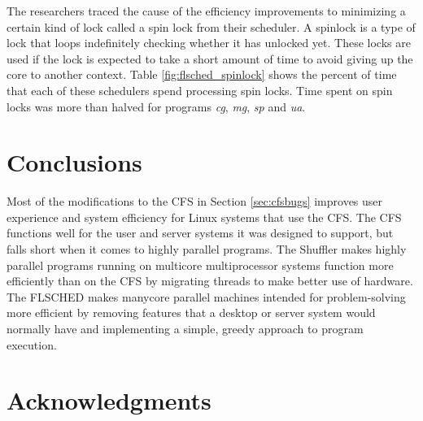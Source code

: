 \documentclass{sig-alternate}
\begin{document}
The researchers traced the cause of the efficiency improvements to minimizing a certain kind of lock called a spin lock from their scheduler. A spinlock is a type of lock that loops indefinitely checking whether it has unlocked yet. These locks are used if the lock is expected to take a short amount of time to avoid giving up the core to another context. Table \ref{fig:flsched_spinlock} shows the percent of time that each of these schedulers spend processing spin locks. Time spent on spin locks was more than halved for programs \textit{cg}, \textit{mg}, \textit{sp} and \textit{ua}.~\cite{Jo:2017}


\section{Conclusions}
\label{sec:conclusions}

Most of the modifications to the CFS in Section \ref{sec:cfsbugs} improves user experience and system efficiency for Linux systems that use the CFS. The CFS functions well for the user and server systems it was designed to support, but falls short when it comes to highly parallel programs. The Shuffler makes highly parallel programs running on multicore multiprocessor systems function more efficiently than on the CFS by migrating threads to make better use of hardware. The FLSCHED makes manycore parallel machines intended for problem-solving more efficient by removing features that a desktop or server system would normally have and implementing a simple, greedy approach to program execution.

\section*{Acknowledgments}
\label{sec:acknowledgments}


  
\end{document}
